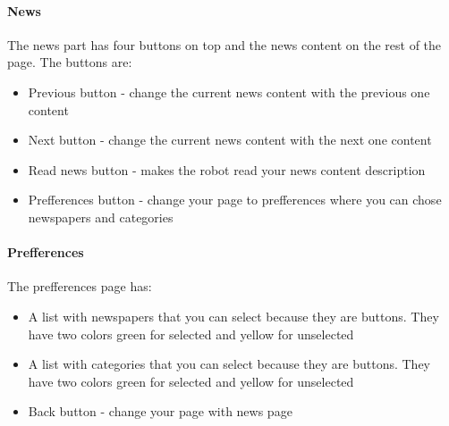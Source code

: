 \paragraph{News}
\label{sub-sec:ui-newsapp-news}
The news part has four buttons on top and the news content on the
rest of the page. The buttons are: 
\begin{itemize}
  \item Previous button - change the current news content with the previous one content
  \item Next button - change the current news content with the next one content
  \item Read news button - makes the robot read your news content description
  \item Prefferences button - change your page to prefferences where you can chose newspapers and
  categories
\end{itemize}

\paragraph{Prefferences}
\label{sub-sec:ui-newsapp-prefferences}
The prefferences page has:
\begin{itemize}
  \item A list with newspapers that you can select because they are buttons. They have two colors
  green for selected and yellow for unselected
  \item A list with categories that you can select because they are buttons. They have two colors
  green for selected and yellow for unselected
  \item Back button - change your page with news page
\end{itemize}